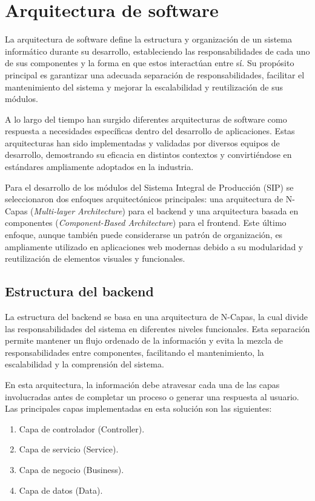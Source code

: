 \section{Arquitectura de software}

La arquitectura de software define la estructura y organización de un sistema informático durante su desarrollo, estableciendo las responsabilidades de cada uno de sus componentes y la forma en que estos interactúan entre sí. Su propósito principal es garantizar una adecuada separación de responsabilidades, facilitar el mantenimiento del sistema y mejorar la escalabilidad y reutilización de sus módulos.

A lo largo del tiempo han surgido diferentes arquitecturas de software como respuesta a necesidades específicas dentro del desarrollo de aplicaciones. Estas arquitecturas han sido implementadas y validadas por diversos equipos de desarrollo, demostrando su eficacia en distintos contextos y convirtiéndose en estándares ampliamente adoptados en la industria.

Para el desarrollo de los módulos del Sistema Integral de Producción (SIP) se seleccionaron dos enfoques arquitectónicos principales: una arquitectura de N-Capas (\textit{Multi-layer Architecture}) para el backend y una arquitectura basada en componentes (\textit{Component-Based Architecture}) para el frontend. Este último enfoque, aunque también puede considerarse un patrón de organización, es ampliamente utilizado en aplicaciones web modernas debido a su modularidad y reutilización de elementos visuales y funcionales.

\subsection{Estructura del backend}

La estructura del backend se basa en una arquitectura de N-Capas, la cual divide las responsabilidades del sistema en diferentes niveles funcionales. Esta separación permite mantener un flujo ordenado de la información y evita la mezcla de responsabilidades entre componentes, facilitando el mantenimiento, la escalabilidad y la comprensión del sistema.

En esta arquitectura, la información debe atravesar cada una de las capas involucradas antes de completar un proceso o generar una respuesta al usuario. Las principales capas implementadas en esta solución son las siguientes:

\begin{enumerate}
    \item Capa de controlador (Controller).
    \item Capa de servicio (Service).
    \item Capa de negocio (Business).
    \item Capa de datos (Data).
\end{enumerate}

